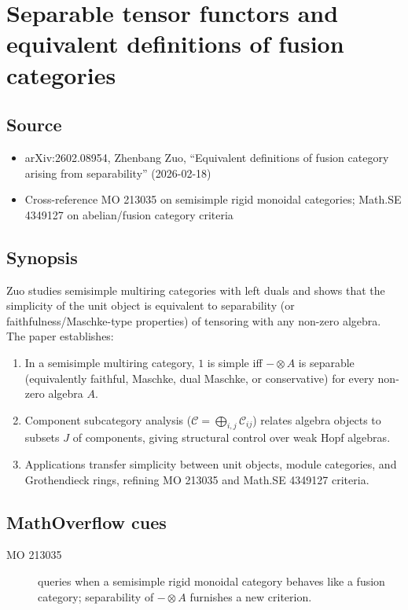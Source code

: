 \section*{Separable tensor functors and equivalent definitions of fusion categories}
\subsection*{Source}
\begin{itemize}
  \item arXiv:2602.08954, Zhenbang Zuo, ``Equivalent definitions of fusion category arising from separability'' (2026-02-18)
  \item Cross-reference MO 213035 on semisimple rigid monoidal categories; Math.SE 4349127 on abelian/fusion category criteria
\end{itemize}
\subsection*{Synopsis}
Zuo studies semisimple multiring categories with left duals and shows that the simplicity of the unit object is equivalent to separability (or faithfulness/Maschke-type properties) of tensoring with any non-zero algebra. The paper establishes:
\begin{enumerate}
  \item In a semisimple multiring category, $1$ is simple iff $-\otimes A$ is separable (equivalently faithful, Maschke, dual Maschke, or conservative) for every non-zero algebra $A$.
  \item Component subcategory analysis ($\mathcal{C} = \bigoplus_{i,j}\mathcal{C}_{ij}$) relates algebra objects to subsets $J$ of components, giving structural control over weak Hopf algebras.
  \item Applications transfer simplicity between unit objects, module categories, and Grothendieck rings, refining MO 213035 and Math.SE 4349127 criteria.
\end{enumerate}
\subsection*{MathOverflow cues}
\begin{description}
  \item[MO 213035] queries when a semisimple rigid monoidal category behaves like a fusion category; separability of $-\otimes A$ furnishes a new criterion.
\end{description}
